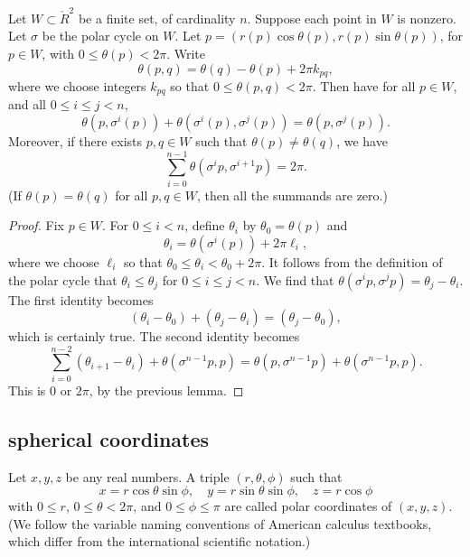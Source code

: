 \begin{lemma}\label{lemma:polar-sum}
Let $W\subset\ring{R}^2$ be a finite set,
of cardinality $n$. Suppose each point in $W$ is nonzero.
Let $\sigma$ be the polar cycle on $W$.  
Let $p=(r(p)\cos\theta(p),r(p)\sin\theta(p))$, for $p\in W$, with
$0\le\theta(p)<2\pi$.
Write
   $$
   \theta(p,q) = \theta(q) - \theta(p) + 2\pi k_{pq},
   $$
where we choose integers $k_{pq}$ so that $0\le \theta(p,q) < 2\pi$.
Then have for all $p\in W$,
and all $0\le i \le j < n$,
   $$
   \theta(p,\sigma^i(p)) +\theta(\sigma^i(p),\sigma^j(p)) =
   \theta(p,\sigma^j(p)).
   $$
Moreover, if there exists $p,q\in W$ such that $\theta(p)\ne\theta(q)$,
we have 
  $$
  \sum_{i=0}^{n-1} \theta(\sigma^{i}p,\sigma^{i+1} p) = 2\pi.
  $$
(If $\theta(p)=\theta(q)$ for all $p,q\in W$, then all the
summands are zero.)
\end{lemma}

\begin{proof}
Fix $p\in W$.
For $0\le i<n$, define $\theta_i$ by
   $\theta_0=\theta(p)$ and 
   $$\theta_i = \theta(\sigma^i(p)) + 2\pi \ell_i,$$
where we choose $\ell_i$ so that $\theta_0\le \theta_i < \theta_0+2\pi$.
It follows from the definition of the polar cycle that
$\theta_i \le \theta_j$ for $0\le i\le j < n$. We find that
$\theta(\sigma^i p ,\sigma^j p) = \theta_j - \theta_i$.
The first identity becomes
  $$
  (\theta_i-\theta_0) + (\theta_j-\theta_i) = (\theta_j-\theta_0),
  $$
which is certainly true.
The second identity becomes
  $$
  \sum_{i=0}^{n-2} (\theta_{i+1}-\theta_i) + \theta(\sigma^{n-1}p,p)
  = \theta(p,\sigma^{n-1}p) + \theta(\sigma^{n-1}p,p).
  $$
This is $0$ or $2\pi$, by the previous lemma.
\end{proof}

\subsection{spherical coordinates}
\label{sec:spherical}


\begin{definition}
Let $x,y,z$ be any real numbers.  A
triple $(r,\theta,\phi)$ such that
    \begin{equation}
    \label{eqn:spherical}
    x = r\cos\theta\sin\phi,\quad y = r\sin\theta\sin\phi,\quad
    z = r\cos\phi
    \end{equation}
with $0\le r$, $0\le\theta<2\pi$, and $0\le\phi\le\pi$ are called
polar coordinates of $(x,y,z)$.  (We follow the variable
naming conventions of American calculus textbooks, which differ
from the international scientific notation.)
\end{definition}

